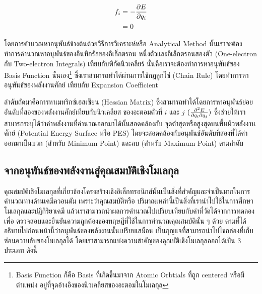 \begin{align}
    f_{i} & = - \pdv{E}{q_{i}} \\
          & = 0
\end{align}

โดยการคำนวณหาอนุพันธ์ข้างต้นด้วยวิธีการวิเคราะห์หรือ Analytical Method นั้นเราจะต้องทำการคำนวณหาอนุพันธ์ของอินทิกรัลของอิเล็กตรอน%
หนึ่งตัวและอิเล็กตรอนสองตัว (One-electron กับ Two-electron Integrals) เทียบกับพิกัดนิวเคลียร์ นั่นคือเราจะต้องทำการหาอนุพันธ์ของ
Basis Function นั่นเอง\footnote{Basis Function ก็คือ Basis ที่เกิดขึ้นมาจาก Atomic Orbtials ที่ถูก centered หรือมีตำแหน่ง%
    อยู่ที่จุดอ้างอิงของนิวเคลียสของอะตอมในโมเลกุล} ซึ่งเราสามารถทำได้ผ่านการใช้กฎลูกโซ่ (Chain Rule) โดยทำการหาอนุพันธ์ของพลังงานศักย์%
เทียบกับ Expansion Coefficient

ลำดับถัดมาคือการหาเมทริกซ์เฮสเซียน (Hessian Matrix) ซึ่งสามารถทำได้โดยการหาอนุพันธ์ย่อยอันดับที่สองของพลังงานศักย์เทียบกับนิวเคลียส%
ของอะตอมตัวที่ $i$ และ $j$ $(\pdv{E}{q_{i}}{q_{j}})$ ซึ่งช่วยให้เราสามารถระบุได้ว่าค่าพลังงานที่คำนวณออกมาได้นั้นสอดคล้องกับ%
จุดต่ำสุดหรือสูงสุดบนพื้นผิวพลังงานศักย์ (Potential Energy Surface หรือ PES) โดยจะสอดคล้องกับอนุพันธ์อันดับที่สองที่ได้ค่าออกมาเป็นบวก
(สำหรับ Minimum Point) และลบ (สำหรับ Maximum Point) ตามลำดับ

\subsection{จากอนุพันธ์ของพลังงานสู่คุณสมบัติเชิงโมเลกุล}
\label{ssec:ener_der_mol_prop}

คุณสมบัติเชิงโมเลกุลที่เกี่ยวข้องโครงสร้างเชิงอิเล็กทรอนิกส์นั้นเป็นสิ่งที่สำคัญและจำเป็นมากในการคำนวณทางด้านเคมีควอนตัม เพราะว่าคุณสมบัติหรือ%
ปริมาณเหล่านี้เป็นสิ่งที่เรานำไปใช้ในการศึกษาโมเลกุลและปฏิกิริยาเคมี แล้วเราสามารถนำผลการคำนวณไปเปรียบเทียบกับค่าที่วัดได้จากการทดลองเพื่อ%
ตรวจสอบและยืนยันความถูกต้องของทฤษฎีที่ใช้ในการคำนวณคุณสมบัตินั้น ๆ ด้วย ตามที่ได้อธิบายไปก่อนหน้านี้ว่าอนุพันธ์ของพลังงานนั้นเปรียบเสมือน%
เป็นกุญแจที่สามารถนำไปไขกล่องที่เก็บซ่อนความลับของโมเลกุลได้ โดยเราสามารถแบ่งความสำคัญของคุณบัติเชิงโมเลกุลออกได้เป็น 3 ประเภท ดังนี้

